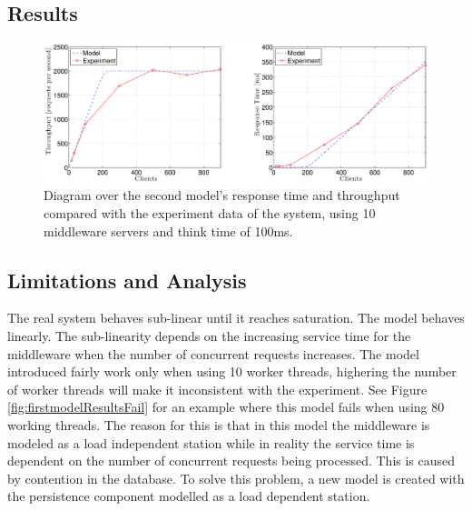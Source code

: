 \documentclass[a4paper, 11pt]{article}
\begin{document}
	\subsection{Results}
	\begin{figure}[cht!]
		\centering
			\includegraphics[width=1\linewidth,keepaspectratio]{firstRealAndModelRespAndThroughput}
		\caption{Diagram over the second model's response time and throughput compared with the experiment data of the system, using 10 middleware servers and think time of 100ms.}
		\label{fig:firstmodelResults}
	\end{figure}
	\FloatBarrier

	\subsection{Limitations and Analysis}
		The real system behaves sub-linear until it reaches saturation. The model behaves linearly. The sub-linearity depends on the increasing service time for the middleware when the number of concurrent requests increases. 
		The model introduced fairly work only when using 10 worker threads, highering the number of worker threads will make it inconsistent with the experiment. See Figure \ref{fig:firstmodelResultsFail} for an example where this model fails when using 80 working threads. The reason for this is that in this model the middleware is modeled as a load independent station while in reality the service time is dependent on the number of concurrent requests being processed. This is caused by contention in the database. To solve this problem, a new model is created with the persistence component modelled as a load dependent station.
\end{document}
